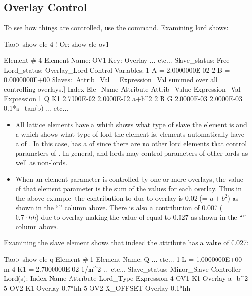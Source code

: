 \documentclass{hitec}     %
\begin{document}
{\newpage

\subsection{Overlay Control}

To see how things are controlled, use the  command. Examining lord  shows:
\begin{code}
Tao> show ele 4    ! Or: show ele ov1

 Element #                4
 Element Name: OV1
 Key: Overlay
... etc...
Slave_status: Free
Lord_status:  Overlay_Lord
Control Variables:
    1   A                                         =  2.0000000E-02
    2   B                                         =  0.0000000E+00
Slaves: [Attrib_Val = Expression_Val summed over all controlling overlays.]
   Index   Ele_Name   Attribute Attrib_Value  Expression_Val    Expression
       1   Q          K1          2.7000E-02      2.0000E-02    a+b^2
       2   B          G           2.0000E-03      2.0000E-03    0.1*a+tan(b)
... etc...
\end{code}

\begin{itemize}
\item
All lattice elements have a  which shows what type of slave the element is and a
 which shows what type of lord the element is.  elements automatically
have a  of . In this case,  has a  of
 since there are no other lord elements that control parameters of . In general,
 and  lords may control parameters of other lords as well as non-lords.
\item
When an element parameter is controlled by one or more overlays, the value of that element parameter
is the sum of the values for each overlay. Thus in the above example, the contribution to  due
to overlay  is 0.02 (= $a+b^2$) as shown in the ``'' column above. There is 
also a contribution of 0.007 (= $0.7 \cdot hh$) due to overlay  making the value of 
equal to 0.027 as shown in the ``'' column above. 
\end{itemize}

Examining the  slave element shows that indeed the  attribute has a value of 0.027:
\begin{code}
Tao> show ele q
 Element #                1
 Element Name: Q
        ... etc...
    1   L                           =  1.0000000E+00 m
    4   K1                          =  2.7000000E-02 1/m^2
        ... etc...
Slave_status: Minor_Slave
Controller Lord(s):
   Index   Name        Attribute           Lord_Type           Expression
       4   OV1         K1                  Overlay             a+b^2
       5   OV2         K1                  Overlay             0.7*hh
       5   OV2         X_OFFSET            Overlay             0.1*hh


\end{code}}
\end{document}

